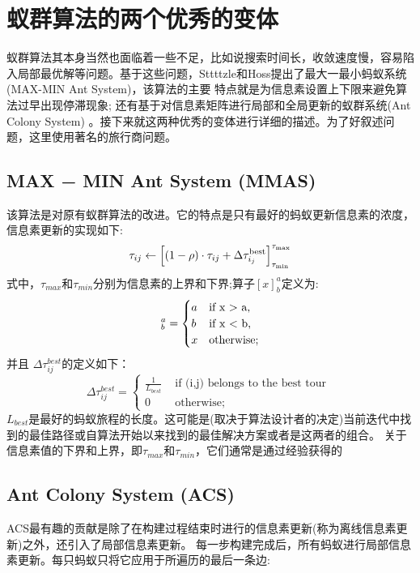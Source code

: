 \documentclass[10pt,a4paper,twocolumn,twoside,UTF8]{ctexart}
\begin{document}
\section{蚁群算法的两个优秀的变体}
	蚁群算法其本身当然也面临着一些不足，比如说搜索时间长，收敛速度慢，容易陷入局部最优解等问题。基于这些问题，Sttttzle和Hoss提出了最大一最小蚂蚁系统(MAX-MIN Ant System)，该算法的主要 特点就是为信息素设置上下限来避免算法过早出现停滞现象; 还有基于对信息素矩阵进行局部和全局更新的蚁群系统(Ant Colony System) 。接下来就这两种优秀的变体进行详细的描述。为了好叙述问题，这里使用著名的旅行商问题。
	
	\subsection{MAX − MIN Ant System (MMAS)}
该算法是对原有蚁群算法的改进。它的特点是只有最好的蚂蚁更新信息素的浓度，信息素更新的实现如下:
	\begin{equation}
	\tau_{ij}\leftarrow\left[(1-\rho)\cdot\tau_{ij}+\Delta\tau_{i_{j}}^{{\rm best}}\right]_{\tau_{\min}}^{\tau_{\max}}
	\end{equation}	
式中，$\tau_{max}$和$\tau_{min}$分别为信息素的上界和下界;算子$[x]^a_b$定义为:
	\begin{equation}
	[x]_{b}^{a}=
		\begin{cases}
		a & \text{\rm if x > a, } \\
		b & \text{\rm if x < b,} \\ 
		x & \text{\rm otherwise;}
		\end{cases}
	\end{equation}	
并且 	$\Delta\tau_{ij}^{best}$的定义如下：
	\begin{equation}
	\Delta\tau_{ij}^{best}=
	\begin{cases}
	\frac{1}{L_{best}} & \text{ if (i,j) belongs to the best tour } \\ 
	0 & \text{ otherwise;}
	\end{cases}
	\end{equation}	
	$L_{best}$是最好的蚂蚁旅程的长度。这可能是(取决于算法设计者的决定)当前迭代中找到的最佳路径或自算法开始以来找到的最佳解决方案或者是这两者的组合。
	关于信息素值的下界和上界，即$\tau_{max}$和$\tau_{min}$，它们通常是通过经验获得的
	
	\subsection{Ant Colony System (ACS) }
	ACS最有趣的贡献是除了在构建过程结束时进行的信息素更新(称为离线信息素更新)之外，还引入了局部信息素更新。
	每一步构建完成后，所有蚂蚁进行局部信息素更新。每只蚂蚁只将它应用于所遍历的最后一条边:
	
\end{document}
